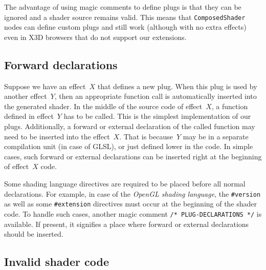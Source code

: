 \documentclass{egpubl}
\begin{document}
The advantage of using magic comments to define plugs is that
they can be ignored and a shader source remains valid.
This means that \texttt{ComposedShader} nodes can define custom plugs
and still work (although with no extra effects) even in X3D browsers
that do not support our extensions.

\subsection{Forward declarations}

Suppose we have an effect~$X$ that defines a new plug.
When this plug is used by another effect~$Y$,
then an appropriate function call is automatically inserted into the generated shader.
In the middle of the source code of effect~$X$,
a function defined in effect~$Y$ has to be called. This is the simplest
implementation of our plugs.
Additionally, a forward or external declaration of the called function
may need to be inserted into the effect~$X$. That is because~$Y$
may be in a separate compilation unit (in case of GLSL),
or just defined lower in the code. In simple cases, such forward or external
declarations can be inserted right at the beginning of effect~$X$ code.

Some shading language directives are required to be placed before
all normal declarations. For example, in case of the \emph{OpenGL shading language},
the \texttt{\#version} as well as some \texttt{\#extension} directives
must occur at the beginning of the shader code.
To handle such cases, another magic comment \texttt{/* PLUG-DECLARATIONS */}
is available.
If present, it signifies a place where forward or external declarations
should be inserted.



\subsection{Invalid shader code}
\end{document}
